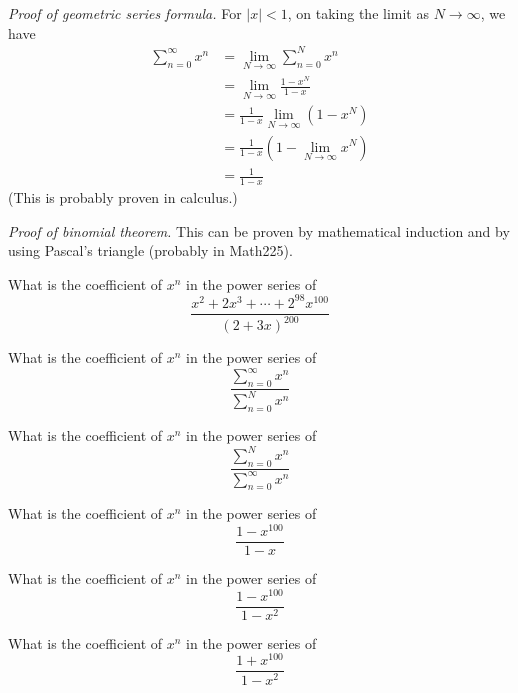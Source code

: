 \textit{Proof of geometric series formula.}
For $|x| < 1$, on taking the limit as $N \rightarrow \infty$, we have
\begin{align*}
\sum_{n=0}^\infty x^n
&= \lim_{N \rightarrow \infty} \sum_{n=0}^N x^n \\
&= \lim_{N \rightarrow \infty} \frac{1 - x^N}{1 - x} \\
&= \frac{1}{1 - x} \lim_{N \rightarrow \infty} \left(1 - x^N\right) \\
&= \frac{1}{1 - x} \left(1 - \lim_{N \rightarrow \infty} x^N\right) \\
&= \frac{1}{1 - x}
\end{align*}
(This is probably proven in calculus.)

\textit{Proof of binomial theorem.}
This can be proven by mathematical induction
and by using Pascal's triangle (probably in Math225).

\newpage

\newpage
\begin{ex}
What is the coefficient of $x^n$ in the power series of
\[
\frac{x^2 + 2x^3 + \cdots + 2^{98}x^{100}}{(2 + 3x)^{200}}
\]
\end{ex}



\newpage
\begin{ex}
What is the coefficient of $x^n$ in the power series of
\[
\frac{\sum_{n=0}^\infty x^n}{\sum_{n=0}^N x^n}
\]
\end{ex}



\newpage
\begin{ex}
What is the coefficient of $x^n$ in the power series of
\[
\frac{\sum_{n=0}^N x^n}{\sum_{n=0}^\infty x^n}
\]
\end{ex}



\newpage
\begin{ex}
What is the coefficient of $x^n$ in the power series of
\[
\frac{1 - x^{100}}{1 - x}
\]
\end{ex}



\newpage
\begin{ex}
What is the coefficient of $x^n$ in the power series of
\[
\frac{1 - x^{100}}{1 - x^2}
\]
\end{ex}

\newpage
\begin{ex}
What is the coefficient of $x^n$ in the power series of
\[
\frac{1 + x^{100}}{1 - x^2}
\]
\end{ex}

